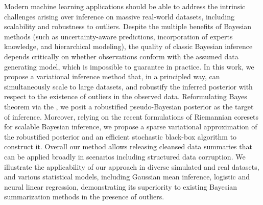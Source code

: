 {
	Modern machine learning applications should be able to address the intrinsic challenges arising over inference on massive real-world datasets, including scalability and robustness to outliers. Despite the multiple benefits of Bayesian methods (such as uncertainty-aware predictions, incorporation of experts knowledge, and hierarchical modeling), the quality of classic Bayesian inference depends critically on whether observations conform with the assumed data generating model, which is impossible to guarantee in practice. In this work, we propose a variational inference method that, in a principled way, can simultaneously scale to large datasets, and robustify the inferred posterior with respect to the existence of outliers in the observed data. Reformulating Bayes theorem via the \bdiv, we posit a robustified pseudo-Bayesian posterior as the target of inference. Moreover, relying on the recent formulations of Riemannian coresets for scalable Bayesian inference, we propose a sparse variational approximation of the robustified posterior and an efficient stochastic black-box algorithm to construct it. Overall our method allows releasing cleansed data summaries  that can be applied broadly in scenarios including structured data corruption. We illustrate the applicability of our approach in diverse simulated and real datasets, and various statistical models, including Gaussian mean inference, logistic and neural linear regression, demonstrating its superiority to existing Bayesian summarization methods in the presence of outliers. %
}